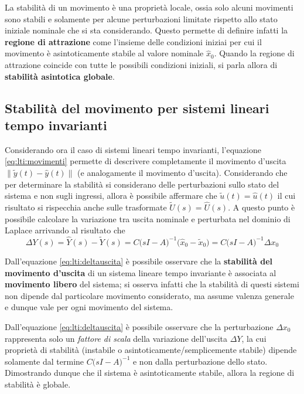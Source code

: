 	\begin{osservazione}
		La stabilità di un movimento è una proprietà locale, ossia solo alcuni movimenti sono stabili e solamente per alcune perturbazioni limitate rispetto allo stato iniziale nominale che si sta considerando. Questo permette di definire infatti la \textbf{regione di attrazione} come l'insieme delle condizioni iniziai per cui il movimento è asintoticamente stabile al valore nominale $\hat x_0$. Quando la regione di attrazione coincide con tutte le possibili condizioni iniziali, si parla allora di \textbf{stabilità asintotica globale}.
	\end{osservazione}
	
	\subsection{Stabilità del movimento per sistemi lineari tempo invarianti}
		Considerando ora il caso di sistemi lineari tempo invarianti, l'equazione \ref{eq:lti:movimenti} permette di descrivere completamente il movimento d'uscita $\|\tilde y(t) - \hat y(t) \|$ (e analogamente il movimento d'uscita). Considerando che per determinare la stabilità si considerano delle perturbazioni sullo stato del sistema e non sugli ingressi, allora è possibile affermare che $\tilde u(t) = \hat u(t)$ il cui risultato si rispecchia anche sulle trasformate $\tilde U(s) = \hat U(s)$. A questo punto è possibile calcolare la variazione tra uscita nominale e perturbata nel dominio di Laplace arrivando al risultato che
		\begin{equation} \label{eq:lti:deltauscita}
			\Delta Y(s) = \hat Y(s) - \tilde Y(s) = C \big(sI-A\big)^{-1}\big(\hat x_0 - \tilde x_0\big) = C\big(sI-A\big)^{-1} \Delta x_0
		\end{equation}
		\begin{concetto} \label{conc:lti:regionetotale}
			Dall'equazione \ref{eq:lti:deltauscita} è possibile osservare che la \textbf{stabilità del movimento d'uscita} di un sistema lineare tempo invariante è associata al \textbf{movimento libero} del sistema; si osserva infatti che la stabilità di questi sistemi non dipende dal particolare movimento considerato, ma assume valenza generale e dunque vale per ogni movimento del sistema.
		\end{concetto}
		Dall'equazione \ref{eq:lti:deltauscita} è possibile osservare che la perturbazione $\Delta x_0$ rappresenta solo un \textit{fattore di scala} della variazione dell'uscita $\Delta Y$, la cui proprietà di stabilità (instabile o asintoticamente/semplicemente stabile) dipende solamente dal termine $C\big(sI-A\big)^{-1}$ e non dalla perturbazione dello stato. Dimostrando dunque che il sistema è asintoticamente stabile, allora la regione di stabilità è globale.
		
